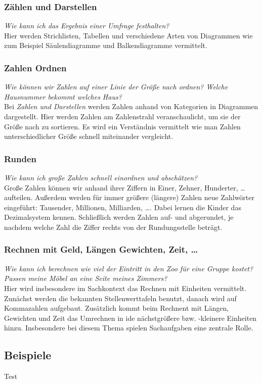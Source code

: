 \documentclass{article}
\begin{document}
\subsubsection*{Zählen und Darstellen}
\textit{Wie kann ich das Ergebnis einer Umfrage festhalten? } \\Hier werden Strichlisten, Tabellen und verschiedene Arten von Diagrammen wie zum Beispiel Säulendiagramme und Balkendiagramme vermittelt.
\subsubsection*{Zahlen Ordnen}
\textit{Wie können wir Zahlen auf einer Linie der Größe nach ordnen? Welche Hausnummer bekommt welches Haus? }\\
Bei \textit{Zahlen und Darstellen} werden Zahlen anhand von Kategorien in Diagrammen dargestellt. Hier werden Zahlen am Zahlenstrahl veranschaulicht, um sie der Größe nach zu sortieren.
Es wird ein Verständnis vermittelt wie man Zahlen unterschiedlicher Größe schnell miteinander vergleicht.
\subsubsection*{Runden}
\textit{Wie kann ich große Zahlen schnell einordnen und abschätzen?}\\
Große Zahlen können wir anhand ihrer Ziffern in Einer, Zehner, Hunderter, \ldots aufteilen. Außerdem werden für immer größere (längere) Zahlen neue Zahlwörter eingeführt: Tausender, Millionen, Milliarden, \ldots. Dabei lernen die Kinder das Dezimalsystem kennen.
Schließlich werden Zahlen auf- und abgerundet, je nachdem welche Zahl die Ziffer rechts von der Rundungsstelle beträgt.
\subsubsection*{Rechnen mit Geld, Längen Gewichten, Zeit, \ldots}
\textit{Wie kann ich berechnen wie viel der Eintritt in den Zoo für eine Gruppe kostet? Passen meine Möbel an eine Seite meines Zimmers?}\\
Hier wird insbesondere im Sachkontext das Rechnen mit Einheiten vermittelt. Zunächst werden die bekannten Stellenwerttafeln benutzt, danach wird auf Kommazahlen aufgebaut.
Zusätzlich kommt beim Rechnent mit Längen, Gewichten und Zeit das Umrechnen in ide nächstgrößere bzw. -kleinere Einheiten hinzu. Insbesondere bei diesem Thema spielen Sachaufgaben eine zentrale Rolle.
\subsection{Beispiele}
\begin{tcolorbox}[colback=gray!5!white,colframe=gray!25!black]
Test
\end{tcolorbox}
\end{document}
